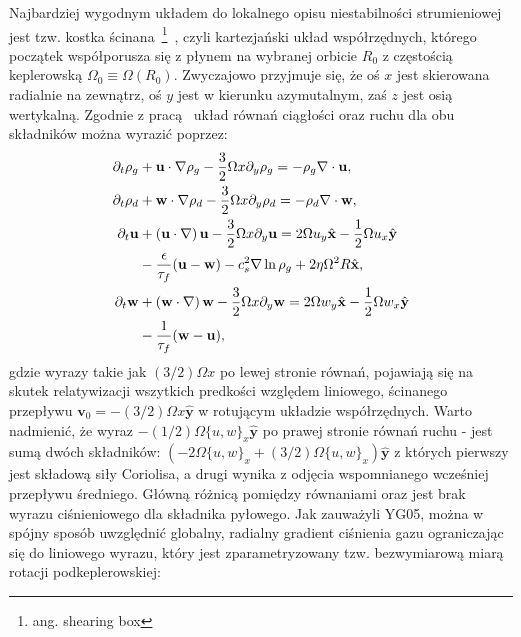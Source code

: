 Najbardziej wygodnym układem do lokalnego opisu niestabilności strumieniowej
jest tzw. kostka ścinana~\footnote{ang. shearing box}~\citep{HGB95}, czyli
kartezjański układ współrzędnych, którego początek współporusza się z płynem na
wybranej orbicie $R_0$ z częstością keplerowską $\Omega_0 \equiv
\Omega\left(R_0\right)$. Zwyczajowo przyjmuje się, że oś $x$ jest skierowana
radialnie na zewnątrz, oś $y$ jest w kierunku azymutalnym, zaś $z$ jest osią
wertykalną. Zgodnie z pracą~\cite*{YJ07} układ równań ciągłości oraz ruchu dla
obu składników można wyrazić poprzez:
%
\begin{align}
\partial_t \rho_g &+ \mathbf{u}\cdot\nabla\rho_g - \frac{3}{2}\Omega x\partial_y\rho_g 
 = -\rho_g\nabla\cdot\mathbf{u},\label{eqc1}\\
\partial_t \rho_d &+ \mathbf{w}\cdot\nabla\rho_d - \frac{3}{2}\Omega x\partial_y\rho_d 
 = -\rho_d\nabla\cdot\mathbf{w},\label{eqc2}\\
\partial_t \mathbf{u} &+ \left(\mathbf{u}\cdot\nabla\right)\mathbf{u} 
 - \frac{3}{2}\Omega x\partial_y\mathbf{u} 
 = 2\Omega u_y \hat{\mathbf{x}} -\frac{1}{2}\Omega u_x \hat{\mathbf{y}} \notag\\
 &- \frac{\epsilon}{\tau_f}(\mathbf{u}-\mathbf{w}) -c_s^2\nabla\ln\rho_g 
 +2\eta\Omega^2 R \hat{\mathbf{x}},\label{eqm1}\\
\partial_t \mathbf{w} &+ \left(\mathbf{w}\cdot\nabla\right)\mathbf{w} 
 - \frac{3}{2}\Omega x\partial_y\mathbf{w}
 = 2\Omega w_y \hat{\mathbf{x}} -\frac{1}{2}\Omega w_x \hat{\mathbf{y}} \notag\\
 &- \frac{1}{\tau_f}(\mathbf{w}-\mathbf{u}), \label{eqm2}
\end{align}
%
gdzie wyrazy takie jak $(3/2)\Omega x$ po lewej stronie równań, pojawiają się na
skutek relatywizacji wszytkich predkości względem liniowego, ścinanego przepływu
$\mathbf{v}_0 = -(3/2)\Omega x \hat{\mathbf{y}}$ w rotującym układzie
współrzędnych. Warto nadmienić, że wyraz $-(1/2)\Omega \{u,w\}_x
\hat{\mathbf{y}}$ po prawej stronie równań ruchu - jest
sumą dwóch składników: $(-2\Omega \{u,w\}_x + (3/2)\Omega \{u,w\}_x)
\hat{\mathbf{y}}$ z których pierwszy jest składową siły Coriolisa, a drugi
wynika z odjęcia wspomnianego wcześniej przepływu średniego. Główną różnicą
pomiędzy równaniami  oraz  jest brak wyrazu ciśnieniowego
dla składnika pyłowego. Jak zauważyli YG05, można w spójny sposób uwzględnić
globalny, radialny gradient ciśnienia gazu ograniczając się do liniowego wyrazu,
który jest zparametryzowany tzw. bezwymiarową miarą rotacji podkeplerowskiej:

